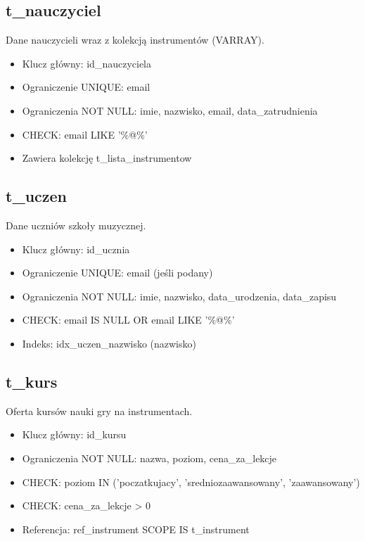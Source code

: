 \documentclass[12pt,a4paper]{article}
\begin{document}
\subsection{t\_nauczyciel}

Dane nauczycieli wraz z kolekcją instrumentów (VARRAY).

\begin{itemize}[nosep]
    \item Klucz główny: id\_nauczyciela
    \item Ograniczenie UNIQUE: email
    \item Ograniczenia NOT NULL: imie, nazwisko, email, data\_zatrudnienia
    \item CHECK: email LIKE '\%@\%'
    \item Zawiera kolekcję t\_lista\_instrumentow
\end{itemize}

\subsection{t\_uczen}

Dane uczniów szkoły muzycznej.

\begin{itemize}[nosep]
    \item Klucz główny: id\_ucznia
    \item Ograniczenie UNIQUE: email (jeśli podany)
    \item Ograniczenia NOT NULL: imie, nazwisko, data\_urodzenia, data\_zapisu
    \item CHECK: email IS NULL OR email LIKE '\%@\%'
    \item Indeks: idx\_uczen\_nazwisko (nazwisko)
\end{itemize}

\subsection{t\_kurs}

Oferta kursów nauki gry na instrumentach.

\begin{itemize}[nosep]
    \item Klucz główny: id\_kursu
    \item Ograniczenia NOT NULL: nazwa, poziom, cena\_za\_lekcje
    \item CHECK: poziom IN ('poczatkujacy', 'sredniozaawansowany', 'zaawansowany')
    \item CHECK: cena\_za\_lekcje > 0
    \item Referencja: ref\_instrument SCOPE IS t\_instrument
\end{itemize}
\end{document}
